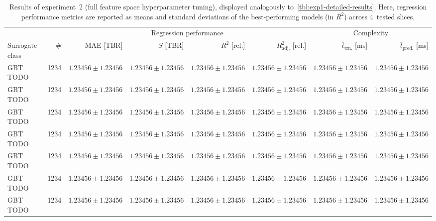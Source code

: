 \begin{table}[h]
	\centering
	{\footnotesize
		\begin{tabular}{lrrrrrrr}
		\toprule
		{} & {} & \multicolumn{4}{c}{Regression performance} &
		\multicolumn{2}{c}{Complexity}\\
		\cmidrule(lr){3-6}
		\cmidrule(lr){7-8}
		Surrogate class & \# & MAE [TBR] & $S$ [TBR] & $R^2$ [rel.] & $R^2_{\text{adj.}}$ [rel.]
						& $\overline{t}_{\text{trn.}}$ [ms] &
						$\overline{t}_{\text{pred.}}$ [ms]\\
		\midrule
		GBT TODO
						& \num{1234}
						& $\num{1.23456} \pm \num{1.23456}$
						& $\num{1.23456} \pm \num{1.23456}$
						& $\num{1.23456} \pm \num{1.23456}$
						& $\num{1.23456} \pm \num{1.23456}$
						& $\num{1.23456} \pm \num{1.23456}$
						& $\num{1.23456} \pm \num{1.23456}$
		\\
		GBT TODO
						& \num{1234}
						& $\num{1.23456} \pm \num{1.23456}$
						& $\num{1.23456} \pm \num{1.23456}$
						& $\num{1.23456} \pm \num{1.23456}$
						& $\num{1.23456} \pm \num{1.23456}$
						& $\num{1.23456} \pm \num{1.23456}$
						& $\num{1.23456} \pm \num{1.23456}$
		\\
		GBT TODO
						& \num{1234}
						& $\num{1.23456} \pm \num{1.23456}$
						& $\num{1.23456} \pm \num{1.23456}$
						& $\num{1.23456} \pm \num{1.23456}$
						& $\num{1.23456} \pm \num{1.23456}$
						& $\num{1.23456} \pm \num{1.23456}$
						& $\num{1.23456} \pm \num{1.23456}$
		\\
		GBT TODO
						& \num{1234}
						& $\num{1.23456} \pm \num{1.23456}$
						& $\num{1.23456} \pm \num{1.23456}$
						& $\num{1.23456} \pm \num{1.23456}$
						& $\num{1.23456} \pm \num{1.23456}$
						& $\num{1.23456} \pm \num{1.23456}$
						& $\num{1.23456} \pm \num{1.23456}$
		\\
		GBT TODO
						& \num{1234}
						& $\num{1.23456} \pm \num{1.23456}$
						& $\num{1.23456} \pm \num{1.23456}$
						& $\num{1.23456} \pm \num{1.23456}$
						& $\num{1.23456} \pm \num{1.23456}$
						& $\num{1.23456} \pm \num{1.23456}$
						& $\num{1.23456} \pm \num{1.23456}$
		\\
		GBT TODO
						& \num{1234}
						& $\num{1.23456} \pm \num{1.23456}$
						& $\num{1.23456} \pm \num{1.23456}$
						& $\num{1.23456} \pm \num{1.23456}$
						& $\num{1.23456} \pm \num{1.23456}$
						& $\num{1.23456} \pm \num{1.23456}$
						& $\num{1.23456} \pm \num{1.23456}$
		\\
		GBT TODO
						& \num{1234}
						& $\num{1.23456} \pm \num{1.23456}$
						& $\num{1.23456} \pm \num{1.23456}$
						& $\num{1.23456} \pm \num{1.23456}$
						& $\num{1.23456} \pm \num{1.23456}$
						& $\num{1.23456} \pm \num{1.23456}$
						& $\num{1.23456} \pm \num{1.23456}$
		\\
		\bottomrule
		\end{tabular}
	}
	\caption{Results of experiment~2 (full feature space hyperparameter tuning), displayed analogously
		to~\cref{tbl:exp1-detailed-results}. Here, regression performance
		metrics are reported as means and standard deviations of the best-performing
		models (in $R^2$) across 4~tested slices.}
	\label{tbl:exp2-detailed-results}
\end{table}

